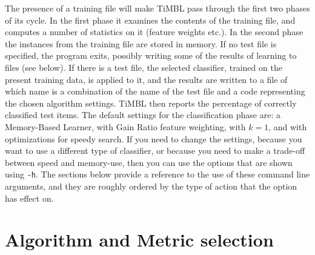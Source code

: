 \documentclass{report}
\begin{document}
The presence of a training file will make TiMBL pass through the first
two phases of its cycle. In the first phase it examines the contents
of the training file, and computes a number of statistics on it
(feature weights etc.). In the second phase the instances from the
training file are stored in memory. If no test file is specified, the
program exits, possibly writing some of the results of learning to
files (see below). If there is a test file, the selected classifier,
trained on the present training data, is applied to it, and the
results are written to a file of which name is a combination of the
name of the test file and a code representing the chosen algorithm
settings. TiMBL then reports the percentage of correctly classified
test items. The default settings for the classification phase are: a
Memory-Based Learner, with Gain Ratio feature weighting, with $k=1$,
and with optimizations for speedy search. If you need to change the
settings, because you want to use a different type of classifier, or
because you need to make a trade-off between speed and memory-use,
then you can use the options that are shown using {\tt -h}. The
sections below provide a reference to the use of these command line
arguments, and they are roughly ordered by the type of action that the
option has effect on.

\section{Algorithm and Metric selection}
\end{document}
